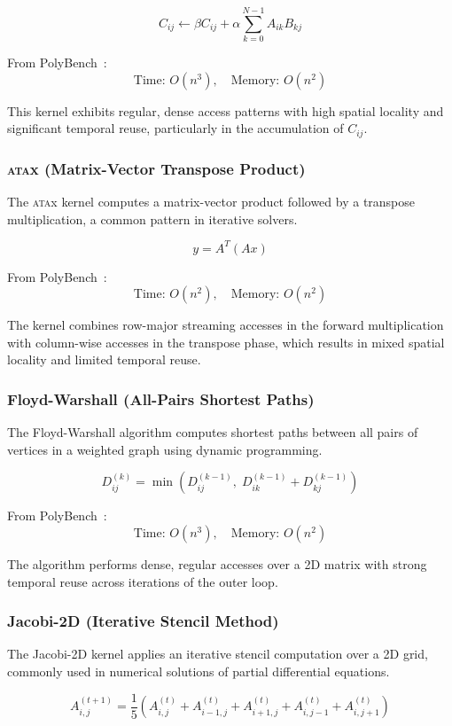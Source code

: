 \documentclass[conference]{IEEEtran}
\begin{document}
\[
C_{ij} \leftarrow \beta C_{ij} + \alpha \sum_{k=0}^{N-1} A_{ik} B_{kj}
\]

From PolyBench~\cite{polybench:2016}:
\[
\text{Time: } O(n^3), \quad \text{Memory: } O(n^2)
\]

This kernel exhibits regular, dense access patterns with high spatial locality
and significant temporal reuse, particularly in the accumulation of $C_{ij}$.

\subsubsection{\textsc{ata}x (Matrix-Vector Transpose Product)} The
\textsc{ata}x kernel computes a matrix-vector product followed by a transpose
multiplication, a common pattern in iterative solvers.

\[
y = A^T (A x)
\]

From PolyBench~\cite{polybench:2016}:
\[
\text{Time: } O(n^2), \quad \text{Memory: } O(n^2)
\]

The kernel combines row-major streaming accesses in the forward multiplication
with column-wise accesses in the transpose phase, which results in mixed
spatial locality and limited temporal reuse.

\subsubsection{Floyd-Warshall (All-Pairs Shortest Paths)} The Floyd-Warshall
algorithm computes shortest paths between all pairs of vertices in a weighted
graph using dynamic programming.\cite{floyd:1962}\cite{warshall:1962}

\[
D_{ij}^{(k)} = \min\left(D_{ij}^{(k-1)},\; D_{ik}^{(k-1)} + D_{kj}^{(k-1)}\right)
\]

From PolyBench~\cite{polybench:2016}:
\[
\text{Time: } O(n^3), \quad \text{Memory: } O(n^2)
\]

The algorithm performs dense, regular accesses over a 2D matrix with strong
temporal reuse across iterations of the outer loop.

\subsubsection{Jacobi-2D (Iterative Stencil Method)} The Jacobi-2D kernel
applies an iterative stencil computation over a 2D grid, commonly used in
numerical solutions of partial differential equations.\cite{golub:2013}

\[
A_{i,j}^{(t+1)} =
\frac{1}{5}\left(
A_{i,j}^{(t)} +
A_{i-1,j}^{(t)} +
A_{i+1,j}^{(t)} +
A_{i,j-1}^{(t)} +
A_{i,j+1}^{(t)}
\right)
\]
\end{document}

